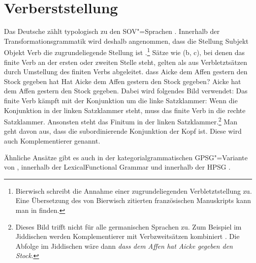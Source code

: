 \section{Verberststellung}
\label{sec-v1}\label{Abschnitt-V1}

Das Deutsche zählt typologisch zu den SOV"=Sprachen \citep{Haider2020a}. Innerhalb der
Transformationsgrammatik\indexgb 
wird deshalb angenommen, dass die Stellung Subjekt Objekt Verb die zugrundeliegende Stellung ist \parencites{Bach62a}[]{Bierwisch63a}{Reis74a}[Kapitel~1]{Thiersch78a}.\footnote{%
  Bierwisch schreibt die Annahme einer zugrundeliegenden Verbletztstellung \citet{Fourquet57a} zu. Eine Übersetzung des von Bierwisch zitierten
  französischen Manuskripts kann man in 
  finden.%
}
Sätze wie (b, c), bei denen das finite Verb an der ersten oder zweiten Stelle steht,
gelten als aus Verbletztsätzen durch Umstellung des finiten Verbs abgeleitet.
\eal
\ex dass Aicke dem Affen gestern den Stock gegeben hat
\ex Hat Aicke dem Affen gestern den Stock gegeben?
\ex Aicke hat dem Affen gestern den Stock gegeben.
\zl
Dabei wird folgendes Bild verwendet: Das finite Verb kämpft mit der Konjunktion um die linke Satzklammer:
Wenn die Konjunktion in der linken Satzklammer steht, muss das finite Verb in die rechte Satzklammer.
Ansonsten steht das Finitum in der linken Satzklammer.\footnote{
  Dieses Bild trifft nicht für alle germanischen Sprachen zu. Zum Beispiel im Jiddischen werden
  Komplementierer mit Verbzweitsätzen kombiniert \citep[]{Diesing2004a}. Die Abfolge im
  Jiddischen wäre dann \emph{dass dem Affen hat Aicke gegeben den Stock}.
} Man geht davon aus, dass die subordinierende Konjunktion
der Kopf ist. Diese wird auch Komplementierer genannt.

Ähnliche Ansätze gibt es auch in der kategorialgrammatischen GPSG"=Variante von \citet[]{Jacobs86a}, innerhalb der Lexical\indexlfg Functional Grammar \citep[14]{Berman96a-u} und innerhalb der HPSG
\label{Seite-V1-via-Lexikonregel}\parencites{KW91a}{Oliva92b}{Netter92}{Frank94}[Abschnitt~2.2.4.2]{Kiss95a}[Abschnitt~3.1.1]{Feldhaus97}[Abschnitte~4.1
und~5.1]{Meurers2000b}{Mueller2005c,MuellerGS}[Abschnitt~6.2.5]{Holler2005a-u}{Crysmann2022a}.

